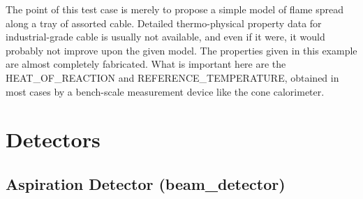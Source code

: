 \documentclass[11pt]{book}
\begin{document}
The point of this test case is merely to propose a simple model of flame spread along a tray of assorted cable. Detailed thermo-physical property data for
industrial-grade cable is usually not available, and even if it were, it would probably not improve upon the given model. The properties given in this example
are almost completely fabricated. What is important here are the
{\ct HEAT\_OF\_REACTION} and {\ct REFERENCE\_TEMPERATURE}, obtained in most cases by a bench-scale measurement device like the cone calorimeter.






\clearpage

\section{Detectors}

\subsection{Aspiration Detector ({\bf beam\_detector}) }
\end{document}
